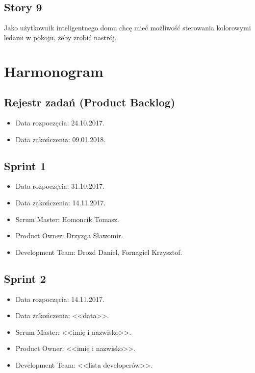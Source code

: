 	\subsection{Story 9}
	Jako użytkownik inteligentnego domu chcę mieć możliwość sterowania kolorowymi ledami w pokoju, żeby zrobić nastrój.
	
	
	\section{Harmonogram}
	
	\subsection{Rejestr zadań (Product Backlog)}
	
	\begin{itemize}
		\item Data rozpoczęcia: 24.10.2017.
		\item  Data zakończenia: 09.01.2018.
	\end{itemize}
\subsection{Sprint 1}

\begin{itemize}
\item Data rozpoczęcia: 31.10.2017.
\item Data zakończenia: 14.11.2017.
\item Scrum Master: Homoncik Tomasz.
\item Product Owner: Drzyzga Sławomir.
\item Development Team: Drozd Daniel, Fornagiel Krzysztof.
\end{itemize}

\subsection{Sprint 2}

\begin{itemize}
	\item Data rozpoczęcia: 14.11.2017.
	\item  Data zakończenia: <<data>>.
	\item Scrum Master: <<imię i nazwisko>>.
	\item Product Owner: <<imię i nazwisko>>.
	\item Development Team: <<lista developerów>>.
\end{itemize}